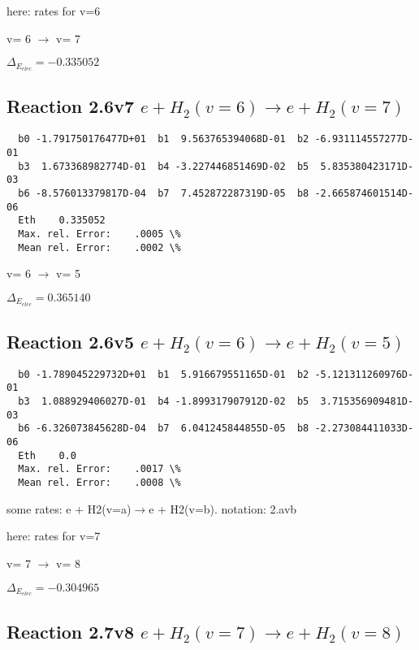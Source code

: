 \documentclass[12pt,dvipdfmx]{article}
\begin{document}
here: rates for v=6

  v=  6 $\rightarrow$ v= 7

$\Delta_{E_{elec}}=-0.335052$


\subsection{
Reaction 2.6v7
$ e + H_2(v=6) \rightarrow e + H_2(v=7) $
}

\begin{small}\begin{verbatim}
  b0 -1.791750176477D+01  b1  9.563765394068D-01  b2 -6.931114557277D-01
  b3  1.673368982774D-01  b4 -3.227446851469D-02  b5  5.835380423171D-03
  b6 -8.576013379817D-04  b7  7.452872287319D-05  b8 -2.665874601514D-06
  Eth    0.335052
  Max. rel. Error:    .0005 \%
  Mean rel. Error:    .0002 \%

\end{verbatim}\end{small}

  v=  6 $\rightarrow$ v= 5

$\Delta_{E_{elec}}= 0.365140$


\subsection{
Reaction 2.6v5
$ e + H_2(v=6) \rightarrow e + H_2(v=5) $
}


\begin{small}\begin{verbatim}
  b0 -1.789045229732D+01  b1  5.916679551165D-01  b2 -5.121311260976D-01
  b3  1.088929406027D-01  b4 -1.899317907912D-02  b5  3.715356909481D-03
  b6 -6.326073845628D-04  b7  6.041245844855D-05  b8 -2.273084411033D-06
  Eth    0.0
  Max. rel. Error:    .0017 \%
  Mean rel. Error:    .0008 \%

\end{verbatim}\end{small}

\newpage
some rates: e + H2(v=a)$\rightarrow$e + H2(v=b). notation: 2.avb

here: rates for v=7

  v=  7 $\rightarrow$ v= 8

$\Delta_{E_{elec}}=-0.304965$


\subsection{
Reaction 2.7v8
$ e + H_2(v=7) \rightarrow e + H_2(v=8) $
}
\end{document}
